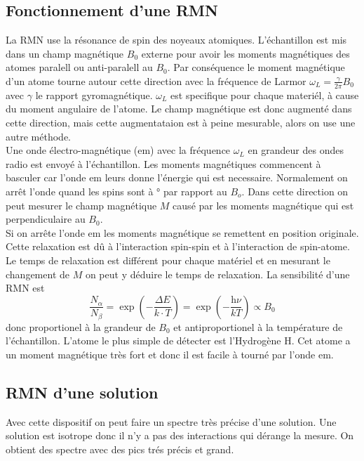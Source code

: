 \documentclass[a4paper,12pt]{scrartcl}
\begin{document}
  \subsection{Fonctionnement d'une RMN}
  La RMN use la résonance de spin des noyeaux atomiques. L'échantillon est mis dans un champ magnétique $B_0$ externe pour avoir les moments magnétiques des atomes paralell ou anti-paralell au $B_0$. Par conséquence le moment magnétique d'un atome tourne autour cette direction avec la fréquence de Larmor $\omega_L=\frac{\gamma}{2\pi}B_0$ avec $\gamma$ le rapport gyromagnétique. $\omega_L$ est specifique pour chaque materiél, à cause du moment angulaire de l'atome. Le champ magnétique est donc augmenté dans cette direction, mais cette augmentataion est à peine mesurable, alors on use une autre méthode.\\
  Une onde électro-magnétique (em) avec la fréquence $\omega_L$ en grandeur des ondes radio est envoyé à l'échantillon. Les moments magnétiques commencent à basculer car l'onde em leurs donne l'énergie qui est necessaire. Normalement on arrêt l'onde quand les spins sont à \unit[90]{\degree} par rapport au $B_o$. Dans cette direction on peut mesurer le champ magnétique $M$ causé par les moments magnétique qui est perpendiculaire au $B_0$.\\
  Si on arrête l'onde em les moments magnétique se remettent en position originale. Cette relaxation est dû à l'interaction spin-spin et à l'interaction de spin-atome. Le temps de relaxation est différent pour chaque matériel et en mesurant le changement de $M$ on peut y déduire le temps de relaxation.   \newline
  La sensibilité d'une RMN est 
  \begin{equation*}
   \frac{N_{\alpha}}{N_{\beta}}=\exp\left(-\frac{\Delta E}{k\cdot T} \right)=\exp\left(-\frac{\text{h}\nu}{kT}\right)\propto B_0
  \end{equation*}
  donc proportionel à la grandeur de $B_0$ et antiproportionel à la température de l'échantillon.\newline
  L'atome le plus simple de détecter est l'Hydrogène H. Cet atome a un moment magnétique très fort et donc il est facile à tourné par l'onde em.

  \subsection{RMN d'une solution}
   Avec cette dispositif on peut faire un spectre très précise d'une solution. Une solution est isotrope donc il n'y a pas des interactions qui dérange la mesure. On obtient des spectre avec des pics trés précis et grand.
\end{document}
